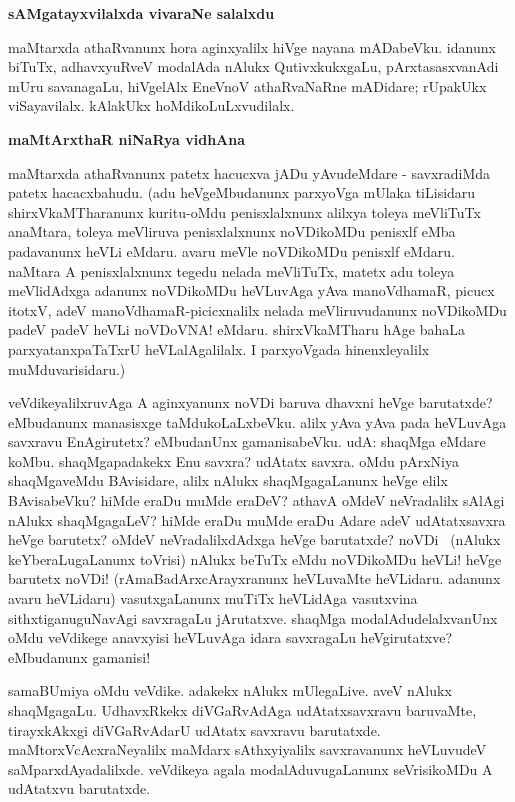 {\bigskip
\noindent
{\large\bf sAMgatayxvilalxda vivaraNe salalxdu}}\label{page118}
\medskip

\noindent
maMtarxda athaRvanunx hora aginxyalilx hiVge nayana mADabeVku. idanunx biTuTx, adhavxyuRveV moda\-lAda nAlukx QutivxkukxgaLu, pArxtasasxvanAdi mUru savanagaLu, hiVgelAlx EneVnoV athaRvaNaRne mADi\-dare; rUpakUkx viSayavilalx. kAlakUkx hoMdikoLuLxvudilalx.

{\bigskip
\noindent
{\large\bf maMtArxthaR niNaRya vidhAna}}\label{page118}
\medskip

\noindent
maMtarxda athaRvanunx patetx hacucxva jADu yAvudeMdare - savxradiMda patetx hacacxbahudu. (adu heVgeMbudanunx parxyoVga mUlaka tiLisidaru shirxVkaMTharanunx kuritu-oMdu penisxlalxnunx alilxya toleya meVliTuTx anaMtara, toleya meVliruva penisxlalxnunx noVDikoMDu penisxlf eMba padavanunx heVLi eMda\-ru. avaru meVle noVDikoMDu penisxlf eMdaru. naMtara A penisxlalxnunx tegedu nelada meVliTuTx, matetx adu toleya meVlidAdxga adanunx noVDikoMDu heVLuvAga yAva manoVdhamaR, picucx itotxV, adeV manoV\-dhamaR-picicxnalilx nelada meVliruvudanunx noVDikoMDu padeV padeV heVLi noVDoVNA! eMdaru. shirxVkaMTharu hAge bahaLa parxyatanxpaTaTxrU heVLalAgalilalx. I parxyoVgada hinenxleyalilx muMdu\-varisidaru.)

veVdikeyalilxruvAga A aginxyanunx noVDi baruva dhavxni heVge barutatxde? 
eMbudanunx manasisxge taMdu\-koLaLx\-beVku. alilx yAva yAva pada heVLuvAga 
savxravu EnAgirutetx? eMbudanUnx gamanisa\-beVku. udA: shaqMga eMdare 
koMbu. shaqMgapadakekx Enu savxra? udAtatx savxra. oMdu pArxNiya 
shaqMga\-veMdu BAvisi\-dare, alilx nAlukx shaqMgagaLanunx heVge elilx 
BAvisabeVku? hiMde eraDu muMde eraDeV? athavA oMdeV neVradalilx sAlAgi nAlukx shaqMgagaLeV? hiMde eraDu muMde eraDu Adare adeV udAtatx\-savxra heVge barutetx? 
oMdeV neVradalilxdAdxga heVge barutatxde? noVDi~ (nAlukx keYberaLugaLanunx toVrisi) nAlukx beTuTx eMdu noVDikoMDu heVLi! heVge barutetx noVDi! (rAmaBadArxcArayxranunx heVLuvaMte heVLi\-daru. adanunx avaru heVLidaru) vasutxgaLanunx muTiTx heVLidAga vasutxvina sithxtiganuguNavAgi savxragaLu jAru\-tatxve. shaqMga modalAdudelalxvanUnx oMdu veVdikege anavxyisi heVLuvAga idara savxragaLu heVgiru\-tatxve? eMbudanunx gamanisi!

samaBUmiya oMdu veVdike. adakekx nAlukx mUlegaLive. aveV nAlukx 
shaqMgagaLu. UdhavxRkekx diVGaRvAdAga udAtatxsavxravu baruvaMte, 
tirayxkAkxgi diVGaRvAdarU udAtatx savxravu barutatxde. 
maMtorxVcAcxraNeyalilx maMdarx sAthxyiyalilx savxravanunx heVLuvudeV 
saMparxdAyadalilxde. veVdikeya agala modalAduvugaLanunx seVrisikoMDu A udAtatxvu barutatxde.

